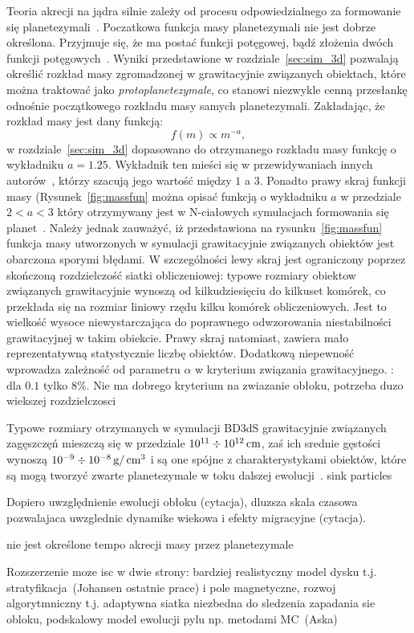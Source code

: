 \par Teoria akrecji na jądra silnie zależy od procesu odpowiedzialnego za
formowanie się planetezymali~\cite{HBP13}. Poczatkowa funkcja masy planetezymali
nie jest dobrze określona. Przyjmuje się, że ma postać funkcji potęgowej, bądź
złożenia dwóch funkcji potęgowych~\cite{R03}. Wyniki przedstawione w
rozdziale~\ref{sec:sim_3d} pozwalają określić rozkład masy zgromadzonej w
grawitacyjnie związanych obiektach, które można traktować jako
\emph{protoplanetezymale}, co stanowi niezwykle cenną przesłankę odnośnie
początkowego rozkładu masy samych planetezymali. Zakładając, że rozkład masy
jest dany funkcją:
%
\begin{equation}
   f(m) \propto m^{-a},
\end{equation}
%
w rozdziale~\ref{sec:sim_3d} dopasowano do otrzymanego rozkładu masy funkcję o
wykładniku $a = 1.25$. Wykładnik ten mieści się w przewidywaniach innych
autorów~\cite{R03}, którzy szacują jego wartość między $1$ a $3$. Ponadto prawy
skraj funkcji masy (Rysunek~\ref{fig:massfun} można opisać funkcją o wykładniku
$a$ w przedziale $2 < a < 3$ który otrzymywany jest w N-ciałowych symulacjach
formowania się planet~\cite{MFFK98}.  Należy jednak zauważyć, iż przedstawiona
na rysunku~\ref{fig:massfun} funkcja masy utworzonych w symulacji grawitacyjnie
związanych obiektów jest obarczona sporymi błędami. W szczególności lewy skraj
jest ograniczony poprzez skończoną rozdzielczość siatki obliczeniowej:
typowe rozmiary obiektow związanych grawitacyjnie wynoszą od kilkudziesięciu do
kilkuset komórek, co przekłada się na rozmiar liniowy rzędu kilku komórek
obliczeniowych. Jest to wielkość wysoce niewystarczająca do poprawnego
odwzorowania niestabilności grawitacyjnej w takim obiekcie.
Prawy skraj natomiast, zawiera mało reprezentatywną statystycznie liczbę obiektów.
Dodatkową niepewność wprowadza zależność od parametru $\alpha$ w kryterium
związania grawitacyjnego. 
: dla $0.1$ tylko $8\%$.
Nie ma dobrego kryterium na zwiazanie obłoku, potrzeba duzo wiekszej rozdzielczosci
%
\par Typowe rozmiary otrzymanych w symulacji BD3dS grawitacyjnie związanych
zagęszczęń mieszczą się w przedziale $10^{11} \div 10^{12}\hbox{$\thinspace\textrm{cm}$}$, zaś ich srednie
gęstości wynoszą $10^{-9} \div 10^{-8}\hbox{$\thinspace\textrm{g}$}/\hbox{$\thinspace\textrm{cm}$}^3$ i są one spójne z
charakterystykami obiektów, które są mogą tworzyć zwarte planetezymale w toku
dalszej ewolucji~\cite{HS08}.
sink particles

Dopiero uwzględnienie ewolucji obłoku (cytacja), dluzsza skala czasowa
pozwalajaca uwzglednic dynamike wiekowa i efekty migracyjne (cytacja).

\par nie jest określone tempo akrecji masy przez planetezymale

Rozszerzenie moze isc w dwie strony: bardziej realistyczny model dysku t.j.
stratyfikacja~(Johansen ostatnie prace) i pole magnetyczne, rozwoj
algorytmniczny t.j. adaptywna siatka niezbedna do sledzenia zapadania sie
obloku, podskalowy model ewolucji pylu np.  metodami MC~(Aska)


